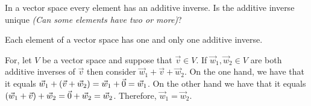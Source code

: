 
\begin{Exercise}[
name={},
title={}, 
difficulty=0,
origin={\cite{JH}}]
    
In a vector space every element has an additive inverse.
Is the additive inverse unique \textit{(Can some elements have two or more)}?
\end{Exercise}

\begin{Answer}



Each element of a vector space has one and only one additive
inverse.

For, let \( V \) be a vector space and suppose that \( \vec{v}\in V \).
If \( \vec{w}_1,\vec{w}_2\in V \) are both additive inverses of
\( \vec{v} \) then consider \( \vec{w}_1+\vec{v}+\vec{w}_2 \).
On the one hand, we have that it equals $\vec{w}_1+(\vec{v}+\vec{w}_2)=
\vec{w}_1+\vec{0}=\vec{w}_1$.
On the other hand we have that it equals $(\vec{w}_1+\vec{v})+\vec{w}_2=
\vec{0}+\vec{w}_2=\vec{w}_2$.
Therefore, $\vec{w}_1=\vec{w}_2$.

\end{Answer}
